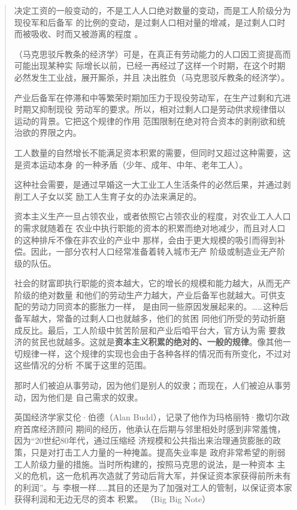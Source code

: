 \begin{quotation}
决定工资的一般变动的，不是工人人口绝对数量的变动，而是工人阶级分为现役军和后备军
的比例的变动，是过剩人口相对量的增减，是过剩人口时而被吸收、时而又被游离的程度
。

（马克思驳斥教条的经济学）可是，在真正有劳动能力的人口因工资提高而可能出现某种实
际增长以前，已经一再经过了这样一个时期，在这个时期必然发生工业战，展开厮杀，并且
决出胜负（马克思驳斥教条的经济学）。

产业后备军在停滞和中等繁荣时期加压力于现役劳动军，在生产过剩和亢进时期又抑制现役
劳动军的要求。所以，相对过剩人口是劳动供求规律借以运动的背景。它把这个规律的作用
范围限制在绝对符合资本的剥削欲和统治欲的界限之内。
\bigskip


工人数量的自然增长不能满足资本积累的需要，但同时又超过这种需要，这是资本运动本身
的一种矛盾（少年、成年、中年、老年工人）。

这种社会需要，是通过早婚这一大工业工人生活条件的必然后果，并通过剥削工人子女以奖
励工人生育子女的办法来满足的。

资本主义生产一旦占领农业，或者依照它占领农业的程度，对农业工人人口的需求就随着在
农业中执行职能的资本的积累而绝对地减少，而且对人口的这种排斥不像在非农业的产业中
那样，会由于更大规模的吸引而得到补偿。因此，一部分农村人口经常准备着转入城市无产
阶级或制造业无产阶级的队伍。

社会的财富即执行职能的资本越大，它的增长的规模和能力越大，从而无产阶级的绝对数量
和他们的劳动生产力越大，产业后备军也就越大。可供支配的劳动力同资本的膨胀力一样，
是由同一些原因发展起来的。……这种后备军越大，常备的过剩人口也就越多，他们的贫困
同他们所受的劳动折磨成反比。最后，工人阶级中贫苦阶层和产业后咱平台大，官方认为需
要救济的贫民也就越多。这就是\textbf{资本主义积累的绝对的、一般的规律}。像其他一
切规律一样，这个规律的实现也会由于各种各样的情况而有所变化，不过对这些情况的分析
不属于这里的范围。

那时人们被迫从事劳动，因为他们是别人的奴隶；而现在，人们被迫从事劳动，因为他们是
自己需求的奴隶。

英国经济学家艾伦·伯德（Alan Budd），记录了他作为玛格丽特·撒切尔政府首席经济顾问
期间的经历，他承认在后期与邻里相处时感到非常羞愧，因为“20世纪80年代，通过压缩经
济规模和公共指出来治理通货膨胀的政策，只是对打击工人力量的一种掩盖。提高失业率是
政府非常希望的削弱工人阶级力量的措施。当时所构建的，按照马克思的说法，是一种资本
主义的危机，这一危机再次造就了劳动后背大军，并保证资本家获得前所未有的利润”。与
李根一样……其目的还是为了加强对工人的管制，以保证资本家获得利润和无边无尽的资本
积累。 （Big Big Note）


\end{quotation}
